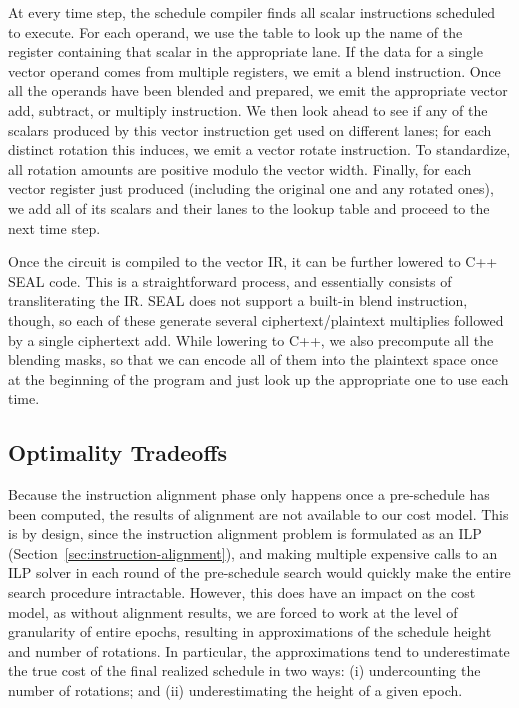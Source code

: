 At every time step, the schedule compiler finds all scalar instructions scheduled to execute.
For each operand, we use the table to look up the name of the register containing that scalar in the appropriate lane.
If the data for a single vector operand comes from multiple registers, we emit a blend instruction.
Once all the operands have been blended and prepared, we emit the appropriate vector add, subtract, or multiply instruction.
We then look ahead to see if any of the scalars produced by this vector instruction get used on different lanes; for each distinct rotation this induces, we emit a vector rotate instruction.
To standardize, all rotation amounts are positive modulo the vector width.
Finally, for each vector register just produced (including the original one and any rotated ones), we add all of its scalars and their lanes to the lookup table and proceed to the next time step.

Once the circuit is compiled to the vector IR, it can be further lowered to C++ SEAL code.
This is a straightforward process, and essentially consists of transliterating the IR. 
SEAL does not support a built-in blend instruction, though, so each of these generate several ciphertext/plaintext multiplies followed by a single ciphertext add.
While lowering to C++, we also precompute all the blending masks, so that we can encode all of them into the plaintext space once at the beginning of the program and just look up the appropriate one to use each time.

\subsection{Optimality Tradeoffs}\label{sec:optimality-tradeoffs} 
Because the instruction alignment phase only happens once a pre-schedule has been computed, the results of alignment are not available to our cost model.
This is by design, since the instruction alignment problem is formulated as an ILP (Section~\ref{sec:instruction-alignment}), and making multiple expensive calls to an ILP solver in each round of the pre-schedule search would quickly make the entire search procedure intractable.
However, this does have an impact on the cost model, as without alignment results, we are forced to work at the level of granularity of entire epochs, resulting in approximations of the schedule height and number of rotations.
In particular, the approximations tend to underestimate the true cost of the final realized schedule in two ways: (i) undercounting the number of rotations; and (ii) underestimating the height of a given epoch.

